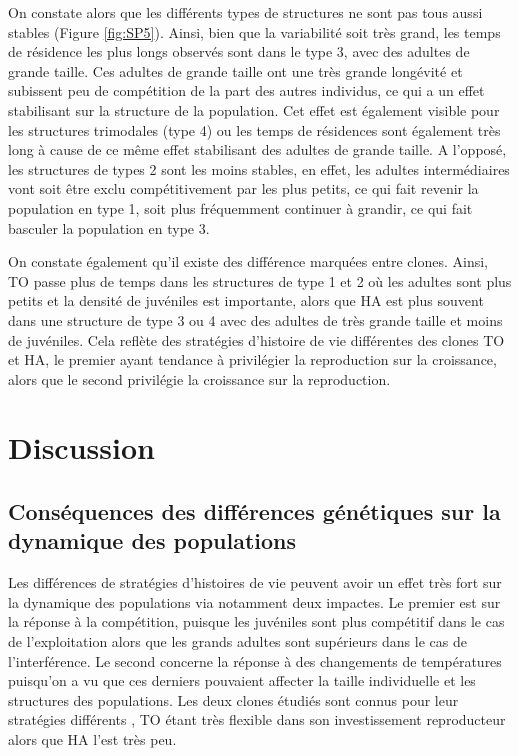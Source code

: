 On constate alors que les différents types de structures ne sont pas tous aussi
stables (Figure \ref{fig:SP5}). Ainsi, bien que la variabilité soit très grand,
les temps de résidence les plus longs observés sont dans le type 3, avec des adultes de grande taille.
Ces adultes de grande taille ont une très grande longévité et subissent peu de
compétition de la part des autres individus, ce qui a un effet stabilisant sur
la structure de la population. Cet effet est également visible pour les
structures trimodales (type 4) ou les temps de résidences sont également très
long à cause de ce même effet stabilisant des adultes de grande taille. A
l'opposé, les structures de types 2 sont les moins stables, en effet, les
adultes intermédiaires vont soit être exclu compétitivement par les plus petits,
ce qui fait revenir la population en type 1, soit plus fréquemment continuer à
grandir, ce qui fait basculer la population en type 3. 

On constate également qu'il existe des différence marquées entre clones. Ainsi,
TO passe plus de temps dans les structures de type 1 et 2 où les adultes sont
plus petits et la densité de juvéniles est importante, alors que HA est plus
souvent dans une structure de type 3 ou 4 avec des adultes de très grande taille
et moins de juvéniles. Cela reflète des stratégies d'histoire de vie différentes
des clones TO et HA, le premier ayant tendance à privilégier la reproduction sur
la croissance, alors que le second privilégie la croissance sur la reproduction.

\section{Discussion}

\subsection{Conséquences des différences génétiques sur la dynamique des
populations}

Les différences de stratégies d'histoires de vie peuvent avoir un effet très
fort sur la dynamique des populations via notamment deux impactes. Le premier
est sur la réponse à la compétition, puisque les juvéniles sont plus compétitif
dans le cas de l'exploitation alors que les grands adultes sont supérieurs dans
le cas de l'interférence. Le second concerne la réponse à des changements de
températures puisqu'on a vu que ces derniers pouvaient affecter la taille
individuelle et les structures des populations. Les deux clones étudiés sont
connus pour leur stratégies différents \autocites{tully2006a,tully2008a}, TO
étant très flexible dans son investissement reproducteur alors que HA l'est très
peu. 

